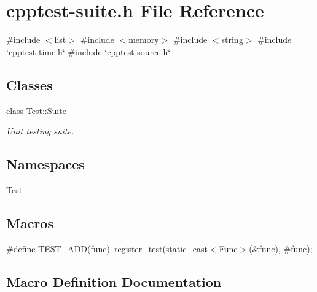 \hypertarget{cpptest-suite_8h}{}\section{cpptest-\/suite.h File Reference}
\label{cpptest-suite_8h}
{\ttfamily \#include $<$list$>$}\newline
{\ttfamily \#include $<$memory$>$}\newline
{\ttfamily \#include $<$string$>$}\newline
{\ttfamily \#include \char`\"{}cpptest-\/time.\+h\char`\"{}}\newline
{\ttfamily \#include \char`\"{}cpptest-\/source.\+h\char`\"{}}\newline
\subsection*{Classes}
\begin{DoxyCompactItemize}
\item 
class \mbox{\hyperlink{class_test_1_1_suite}{Test\+::\+Suite}}
\begin{DoxyCompactList}\small\item\em Unit testing suite. \end{DoxyCompactList}\end{DoxyCompactItemize}
\subsection*{Namespaces}
\begin{DoxyCompactItemize}
\item 
 \mbox{\hyperlink{namespace_test}{Test}}
\end{DoxyCompactItemize}
\subsection*{Macros}
\begin{DoxyCompactItemize}
\item 
\#define \mbox{\hyperlink{cpptest-suite_8h_abe8c3e0a2cf3893ebc1c265264ed9cb8}{T\+E\+S\+T\+\_\+\+A\+DD}}(func)~register\+\_\+test(static\+\_\+cast$<$Func$>$(\&func), \#func);
\end{DoxyCompactItemize}


\subsection{Macro Definition Documentation}
\mbox{\label{cpptest-suite_8h_abe8c3e0a2cf3893ebc1c265264ed9cb8}} 
